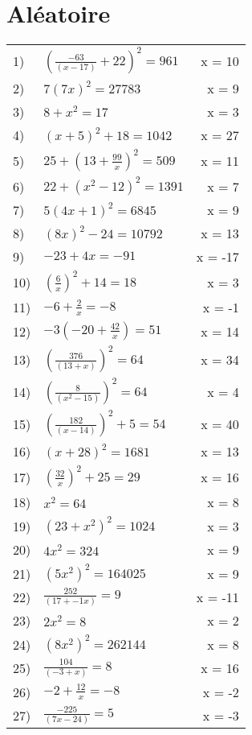 \documentclass{article}
\begin{document}
\section{Aléatoire}

\begin{longtable}{l p{} r}
1) & ${ (\frac{ -63 }{ (x - 17) } + 22) }^2 = 961$ & x = 10 \\ 
2) & $7{ (7x) }^2 = 27783$ & x = 9 \\ 
3) & $8 + { x }^2 = 17$ & x = 3 \\ 
4) & ${ (x + 5) }^2 + 18 = 1042$ & x = 27 \\ 
5) & $25 + { (13 + \frac{ 99 }{ x }) }^2 = 509$ & x = 11 \\ 
6) & $22 + { ({ x }^2 - 12) }^2 = 1391$ & x = 7 \\ 
7) & $5{ (4x + 1) }^2 = 6845$ & x = 9 \\ 
8) & ${ (8x) }^2 - 24 = 10792$ & x = 13 \\ 
9) & $-23 + 4x = -91$ & x = -17 \\ 
10) & ${ (\frac{ 6 }{ x }) }^2 + 14 = 18$ & x = 3 \\ 
11) & $-6 + \frac{ 2 }{ x } = -8$ & x = -1 \\ 
12) & $-3(-20 + \frac{ 42 }{ x }) = 51$ & x = 14 \\ 
13) & ${ (\frac{ 376 }{ (13 + x) }) }^2 = 64$ & x = 34 \\ 
14) & ${ (\frac{ 8 }{ ({ x }^2 - 15) }) }^2 = 64$ & x = 4 \\ 
15) & ${ (\frac{ 182 }{ (x - 14) }) }^2 + 5 = 54$ & x = 40 \\ 
16) & ${ (x + 28) }^2 = 1681$ & x = 13 \\ 
17) & ${ (\frac{ 32 }{ x }) }^2 + 25 = 29$ & x = 16 \\ 
18) & ${ x }^2 = 64$ & x = 8 \\ 
19) & ${ (23 + { x }^2) }^2 = 1024$ & x = 3 \\ 
20) & $4{ x }^2 = 324$ & x = 9 \\ 
21) & ${ (5{ x }^2) }^2 = 164025$ & x = 9 \\ 
22) & $\frac{ 252 }{ (17 + -1x) } = 9$ & x = -11 \\ 
23) & $2{ x }^2 = 8$ & x = 2 \\ 
24) & ${ (8{ x }^2) }^2 = 262144$ & x = 8 \\ 
25) & $\frac{ 104 }{ (-3 + x) } = 8$ & x = 16 \\ 
26) & $-2 + \frac{ 12 }{ x } = -8$ & x = -2 \\ 
27) & $\frac{ -225 }{ (7x - 24) } = 5$ & x = -3 \\ 

\end{longtable}
\end{document}
